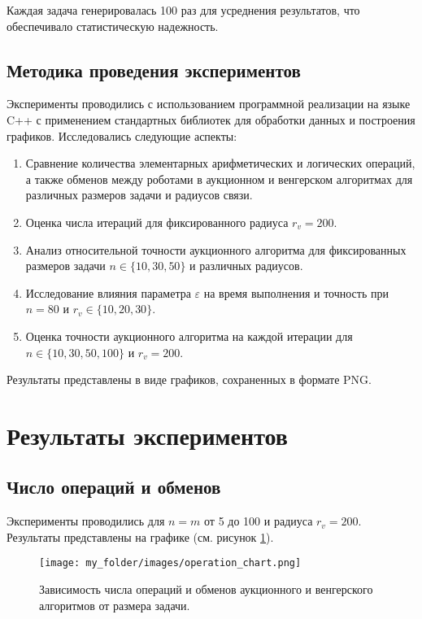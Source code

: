 Каждая задача генерировалась 100 раз для усреднения результатов, что обеспечивало статистическую надежность.

\subsection{Методика проведения экспериментов}

Эксперименты проводились с использованием программной реализации на языке C++ с применением стандартных библиотек для обработки данных и построения графиков. Исследовались следующие аспекты:

\begin{enumerate}
    \item Сравнение количества элементарных арифметических и логических операций, а также обменов между роботами в аукционном и венгерском алгоритмах для различных размеров задачи и радиусов связи.
    \item Оценка числа итераций для фиксированного радиуса \( r_v = 200 \).
    \item Анализ относительной точности аукционного алгоритма для фиксированных размеров задачи \( n \in \{10, 30, 50\} \) и различных радиусов.
    \item Исследование влияния параметра \( \varepsilon \) на время выполнения и точность при \( n = 80 \) и \( r_v \in \{10, 20, 30\} \).
    \item Оценка точности аукционного алгоритма на каждой итерации для \( n \in \{10, 30, 50, 100\} \) и \( r_v = 200 \).
\end{enumerate}

Результаты представлены в виде графиков, сохраненных в формате PNG.

\section{Результаты экспериментов}

\subsection{Число операций и обменов}

\vspace{0.3cm}

Эксперименты проводились для \( n = m \) от 5 до 100 и радиуса \( r_v = 200 \). Результаты представлены на графике (см. рисунок \ref{fig:opeartion_chart}).

\begin{figure}[h]
    \centering
    \texttt{[image: my\_folder/images/operation\_chart.png]}
    \caption{Зависимость числа операций и обменов аукционного и венгерского алгоритмов от размера задачи.}
    \label{fig:opeartion_chart}
\end{figure}

